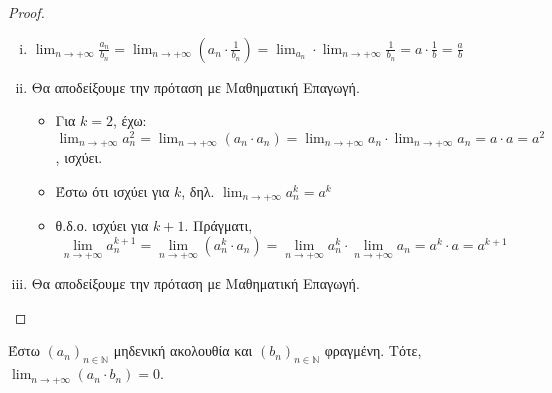\documentclass[main.tex]{subfiles}
\begin{document}
\begin{proof}
\begin{enumerate}[i)]
\begin{proof}
        Έστω $ \varepsilon >0 $, τότε
\[
    \lim_{n \to +\infty} b_{n} =b \Leftrightarrow \exists n_{2} \in \mathbb{N} \; : \; \forall n 
    \geq n_{2} \quad \abs{b - b_{n}} < \frac{\varepsilon \abs{b}^{2}}{2}
 \] 

 Επιλέγουμε $ n_{0} = \max \{ n_{1}, n_{2} \} $. Τότε $ \forall n \geq n_{0} $ ισχύει ότι 
 \[
     \abs{\frac{1}{b_{n}} - \frac{1}{b}} \leq \frac{2 \abs{b -b_{n}}}{\abs{b} ^{2}} < \varepsilon 
  \] 
    \end{proof}

\item $ \lim_{n \to +\infty} \frac{a_{n}}{b_{n}} = \lim_{n \to +\infty} 
    \left(a_{n}\cdot \frac{1}{b_{n}}
    \right) = \lim_{a_{n}} \cdot \lim_{n \to +\infty} \frac{1}{b_{n}} = a \cdot \frac{1}{b} =
    \frac{a}{b}$

\item 
Θα αποδείξουμε την πρόταση με Μαθηματική Επαγωγή.
    \begin{itemize}
        \item Για $ k=2 $, έχω: $ \lim_{n \to +\infty} a_{n}^{2} = \lim_{n \to
            +\infty} (a_{n} \cdot a_{n}) = \lim_{n \to +\infty} a_{n} \cdot \lim_{n \to +\infty}
            a_{n} =  a \cdot a = a^{2}  $, ισχύει.
        \item Έστω ότι ισχύει για $k$, δηλ. $ \lim_{n \to +\infty} a_{n}^{k} = a^{k}  $
        \item θ.δ.ο. ισχύει για $ k+1 $. Πράγματι, 
\[
    \lim_{n \to +\infty} a_{n}^{k+1}= \lim_{n \to +\infty} (a_{n}^{k} \cdot a_{n})  = \lim_{n \to
    +\infty} a_{n}^{k} \cdot \lim_{n \to +\infty} a_{n} = a^{k} \cdot a = a^{k+1}
 \] 
    \end{itemize}

\item 
Θα αποδείξουμε την πρόταση με Μαθηματική Επαγωγή.
\begin{itemize}
\end{itemize}
\end{enumerate}
\end{proof}

\begin{prop}
\item {}
    Έστω $ (a_{n})_{n \in \mathbb{N}} $ μηδενική ακολουθία και $ (b_{n})_{n \in \mathbb{N}} $ 
    φραγμένη. Τότε, $ \lim_{n \to +\infty} (a_{n}\cdot b_{n}) = 0 $. 
\end{prop}
\end{document}
